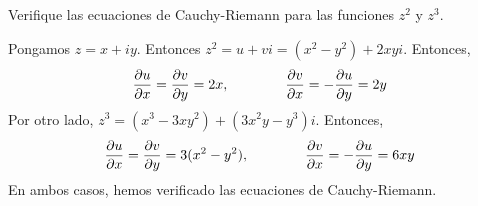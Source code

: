 \begin{exercise}
Verifique las ecuaciones de Cauchy-Riemann para las funciones $z^2$ y $z^3$.
\end{exercise}

\begin{solution}
Pongamos $z = x + iy$. Entonces $z^2 = u + vi = (x^2 - y^2) + 2xyi$. Entonces,
$$\dfrac {\partial u} {\partial x} = \dfrac {\partial v} {\partial y} = 2x, \qquad \qquad \dfrac {\partial v} {\partial x} = -\dfrac {\partial u} {\partial y} = 2y$$
Por otro lado, $z^3 = (x^3 - 3xy^2) + (3x^2y - y^3)i$. Entonces,
$$\dfrac {\partial u} {\partial x} = \dfrac {\partial v} {\partial y} = 3 (x^2 - y^2), \qquad \qquad \dfrac {\partial v} {\partial x} = -\dfrac {\partial u} {\partial y} = 6xy$$
En ambos casos, hemos verificado las ecuaciones de Cauchy-Riemann.
\end{solution}
